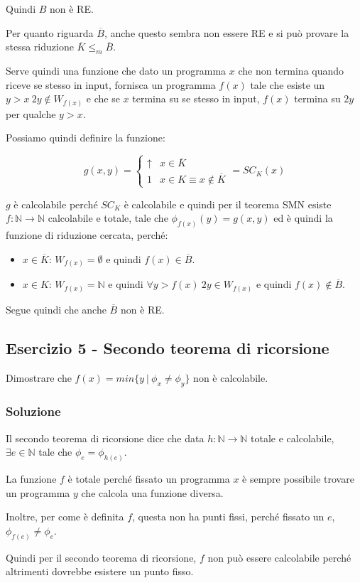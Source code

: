 Quindi $B$ non è RE.

Per quanto riguarda $\overline{B}$, anche questo sembra non essere RE e si può provare la stessa riduzione $\overline{K} \leq_m \overline{B}$.

Serve quindi una funzione che dato un programma $x$ che non termina quando riceve se stesso in input, fornisca un programma $f(x)$ tale che esiste un $y > x \: 2y \notin W_{f(x)}$ e che se $x$ termina su se stesso in input, $f(x)$ termina su $2y$ per qualche $y > x$.

Possiamo quindi definire la funzione:

$$
g(x,y) = \begin{cases}
\uparrow &x \in \overline{K} \\
1 &x \in K \equiv x \notin\overline{K}
\end{cases} = SC_K(x) 
$$

$g$ è calcolabile perché $SC_K$ è calcolabile e quindi per il teorema SMN esiste $f : \mathbb{N} \rightarrow \mathbb{N}$ calcolabile e totale, tale che $\phi_{f(x)}(y) = g(x,y)$ ed è quindi la funzione di riduzione cercata, perché:

\begin{itemize}
	\item $x \in \overline{K}$: $W_{f(x)} = \emptyset$ e quindi $f(x) \in \overline{B}$.
	\item $x \in K$: $W_{f(x)} = \mathbb{N}$ e quindi $\forall y > f(x) \: 2y \in W_{f(x)}$ e quindi $f(x) \notin \overline{B}$. 
\end{itemize}

Segue quindi che anche $\overline{B}$ non è RE.

\subsection{Esercizio 5 - Secondo teorema di ricorsione}

Dimostrare che $f(x) = min \{ y \: | \: \phi_x \neq \phi_y  \}$ non è calcolabile.

\subsubsection{Soluzione}

Il secondo teorema di ricorsione dice che data $h : \mathbb{N} \rightarrow \mathbb{N}$ totale e calcolabile, $\exists e \in \mathbb{N}$ tale che $\phi_e = \phi_{h(e)}$.

La funzione $f$ è totale perché fissato un programma $x$ è sempre possibile trovare un programma $y$ che calcola una funzione diversa.

Inoltre, per come è definita $f$, questa non ha punti fissi, perché fissato un $e$, $\phi_{f(e)} \neq \phi_e$.

Quindi per il secondo teorema di ricorsione, $f$ non può essere calcolabile perché altrimenti dovrebbe esistere un punto fisso.

